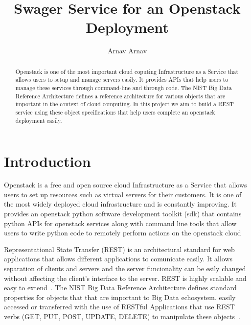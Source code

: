 
\title{Swager Service for an Openstack Deployment}


\author{Arnav Arnav}


\renewcommand{\shortauthors}{Arnav}


\begin{abstract}
Openstack is one of the most important cloud coputing Infrastructure
as a Service that allows users to setup and manage servers easily. It
provides APIs that help users to manage these services through
command-line and through code. The NIST Big Data Reference
Architecture defines a reference architecture for various objects that
are important in the context of cloud computing. In this project we
aim to build a REST service using these object specifications that
help users complete an openstack deployment easily.
\end{abstract}



\maketitle

\section{Introduction}
Openstack is a free and open source cloud Infrastructure as a Service
that allows users to set up resources such as virtual servers for
their customers. It is one of the most widely deployed cloud
infrastructure and is constantly improving. It provides an openstack
python software development toolkit (sdk) that contains python APIs
for openstack services along with command line tools that allow users
to write python code to remotely perform actions on the openstack
cloud

Representational State Transfer (REST) is an architectural standard
for web applications that allows different applications to comunicate
easily. It allows separation of clients and servers and the server
funcionality can be esily changed without affecting the client's
interface to the server. REST is highly scalable and easy to
extend~\cite{hid-sp18-503-REST}. The NIST Big Data Reference
Architecture defines standard properties for objects that that are
important to Big Data echosystem.%
easily accessed or transferred with the use of RESTful Applications
that use REST verbs (GET, PUT, POST, UPDATE, DELETE) to manipulate
these objects~\cite{hid-sp18-503-REST}.

